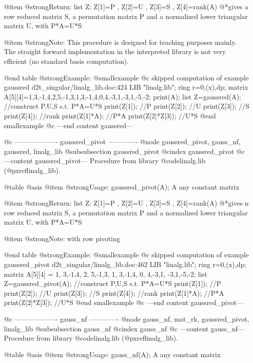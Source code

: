 @item @strong{Return:}
list Z: Z[1]=P , Z[2]=U , Z[3]=S , Z[4]=rank(A)
@*gives a row reduced matrix S, a permutation matrix P and a
normalized lower triangular matrix U, with P*A=U*S

@item @strong{Note:}
This procedure is designed for teaching purposes mainly.
The straight forward implementation in the interpreted library
is not very efficient (no standard basis computation).

@end table
@strong{Example:}
@smallexample
@c skipped computation of example gaussred d2t_singular/linalg_lib.doc:424 
LIB "linalg.lib";
ring r=0,(x),dp;
matrix A[5][4]=1,3,-1,4,2,5,-1,3,1,3,-1,4,0,4,-3,1,-3,1,-5,-2;
print(A);
list Z=gaussred(A);   //construct P,U,S s.t. P*A=U*S
print(Z[1]);          //P
print(Z[2]);          //U
print(Z[3]);          //S
print(Z[4]);          //rank
print(Z[1]*A);        //P*A
print(Z[2]*Z[3]);     //U*S
@end smallexample
@c ---end content gaussred---

@c ------------------- gaussred_pivot -------------
@node gaussred_pivot, gauss_nf, gaussred, linalg_lib
@subsubsection gaussred_pivot
@cindex gaussred_pivot
@c ---content gaussred_pivot---
Procedure from library @code{linalg.lib} (@pxref{linalg_lib}).

@table @asis
@item @strong{Usage:}
gaussred_pivot(A); A any constant matrix

@item @strong{Return:}
list Z: Z[1]=P , Z[2]=U , Z[3]=S , Z[4]=rank(A)
@*gives n row reduced matrix S, a permutation matrix P and a
normalized lower triangular matrix U, with P*A=U*S

@item @strong{Note:}
with row pivoting

@end table
@strong{Example:}
@smallexample
@c skipped computation of example gaussred_pivot d2t_singular/linalg_lib.doc:462 
LIB "linalg.lib";
ring r=0,(x),dp;
matrix A[5][4] = 1, 3,-1,4,
2, 5,-1,3,
1, 3,-1,4,
0, 4,-3,1,
-3,1,-5,-2;
list Z=gaussred_pivot(A);  //construct P,U,S s.t. P*A=U*S
print(Z[1]);               //P
print(Z[2]);               //U
print(Z[3]);               //S
print(Z[4]);               //rank
print(Z[1]*A);             //P*A
print(Z[2]*Z[3]);          //U*S
@end smallexample
@c ---end content gaussred_pivot---

@c ------------------- gauss_nf -------------
@node gauss_nf, mat_rk, gaussred_pivot, linalg_lib
@subsubsection gauss_nf
@cindex gauss_nf
@c ---content gauss_nf---
Procedure from library @code{linalg.lib} (@pxref{linalg_lib}).

@table @asis
@item @strong{Usage:}
gauss_nf(A); A any constant matrix

